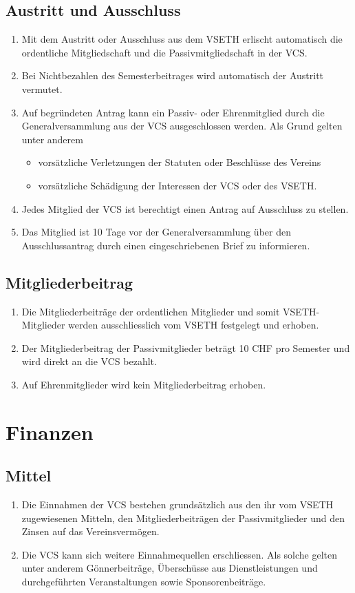 \subsection{Austritt und Ausschluss}
\begin{enumerate}
\item Mit dem Austritt oder Ausschluss aus dem VSETH erlischt automatisch die ordentliche Mitgliedschaft und die Passivmitgliedschaft in der VCS.
\item Bei Nichtbezahlen des Semesterbeitrages wird automatisch der Austritt vermutet.
\item Auf begründeten Antrag kann ein Passiv- oder Ehrenmitglied durch die Generalversammlung aus der VCS ausgeschlossen werden. Als Grund gelten unter anderem
	\begin{itemize}
	\item vorsätzliche Verletzungen der Statuten oder Beschlüsse des Vereins
	\item vorsätzliche Schädigung der Interessen der VCS oder des VSETH.
	\end{itemize}
\item  Jedes Mitglied der VCS ist berechtigt einen Antrag auf Ausschluss zu stellen.
\item Das Mitglied ist 10 Tage vor der Generalversammlung über den Ausschlussantrag durch einen eingeschriebenen Brief zu informieren.
\end{enumerate}

\subsection{Mitgliederbeitrag}
\begin{enumerate}
\item Die Mitgliederbeiträge der ordentlichen Mitglieder und somit VSETH-Mitglieder werden ausschliesslich vom VSETH festgelegt und erhoben.
\item Der Mitgliederbeitrag der Passivmitglieder beträgt 10 CHF pro Semester und wird direkt an die VCS bezahlt.
\item Auf Ehrenmitglieder wird kein Mitgliederbeitrag erhoben.
\end{enumerate}


\section{Finanzen}

\subsection{Mittel}
\begin{enumerate}
\item Die Einnahmen der VCS bestehen grundsätzlich aus den ihr vom VSETH zugewiesenen Mitteln, den Mitgliederbeiträgen der Passivmitglieder und den Zinsen auf das Vereinsvermögen.
\item Die VCS kann sich weitere Einnahmequellen erschliessen. Als solche gelten unter anderem Gönnerbeiträge, Überschüsse aus Dienstleistungen und durchgeführten Veranstaltungen sowie Sponsorenbeiträge.
\end{enumerate}

